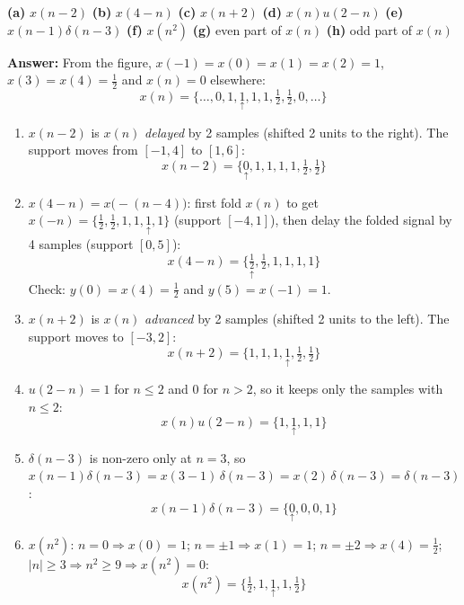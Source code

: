 \documentclass[12pt,a4paper]{article}
\newcommand{\org}[1]{\underset{\uparrow}{#1}}
\begin{document}
\noindent\textbf{(a)} $x(n-2)$ \quad \textbf{(b)} $x(4-n)$ \quad \textbf{(c)} $x(n+2)$ \quad \textbf{(d)} $x(n)u(2-n)$ \quad \textbf{(e)} $x(n-1)\delta(n-3)$ \quad \textbf{(f)} $x(n^2)$ \quad \textbf{(g)} even part of $x(n)$ \quad \textbf{(h)} odd part of $x(n)$

\noindent\textbf{Answer:}
From the figure, $x(-1)=x(0)=x(1)=x(2)=1$, $x(3)=x(4)=\frac{1}{2}$ and $x(n)=0$ elsewhere:
\[
x(n) = \{\dots, 0, 1, \org{1}, 1, 1, \tfrac{1}{2}, \tfrac{1}{2}, 0, \dots\}
\]
\begin{enumerate}[label=\textbf{(\alph*)}, leftmargin=*]
    \item $x(n-2)$ is $x(n)$ \emph{delayed} by 2 samples (shifted 2 units to the right). The support moves from $[-1, 4]$ to $[1, 6]$:
    \[ x(n-2) = \{\org{0}, 1, 1, 1, 1, \tfrac{1}{2}, \tfrac{1}{2}\} \]

    \item $x(4-n) = x\big(-(n-4)\big)$: first fold $x(n)$ to get $x(-n) = \{\tfrac12, \tfrac12, 1, 1, \org{1}, 1\}$ (support $[-4, 1]$), then delay the folded signal by 4 samples (support $[0, 5]$):
    \[ x(4-n) = \{\org{\tfrac{1}{2}}, \tfrac{1}{2}, 1, 1, 1, 1\} \]
    Check: $y(0) = x(4) = \frac12$ and $y(5) = x(-1) = 1$.

    \item $x(n+2)$ is $x(n)$ \emph{advanced} by 2 samples (shifted 2 units to the left). The support moves to $[-3, 2]$:
    \[ x(n+2) = \{1, 1, 1, \org{1}, \tfrac{1}{2}, \tfrac{1}{2}\} \]

    \item $u(2-n) = 1$ for $n \le 2$ and $0$ for $n > 2$, so it keeps only the samples with $n \le 2$:
    \[ x(n)u(2-n) = \{1, \org{1}, 1, 1\} \]

    \item $\delta(n-3)$ is non-zero only at $n = 3$, so $x(n-1)\delta(n-3) = x(3-1)\,\delta(n-3) = x(2)\,\delta(n-3) = \delta(n-3)$:
    \[ x(n-1)\delta(n-3) = \{\org{0}, 0, 0, 1\} \]

    \item $x(n^2)$: $n = 0 \Rightarrow x(0) = 1$; $n = \pm1 \Rightarrow x(1) = 1$; $n = \pm 2 \Rightarrow x(4) = \frac12$; $|n| \ge 3 \Rightarrow n^2 \ge 9 \Rightarrow x(n^2) = 0$:
    \[ x(n^2) = \{\tfrac{1}{2}, 1, \org{1}, 1, \tfrac{1}{2}\} \]


\end{enumerate}
\end{document}
